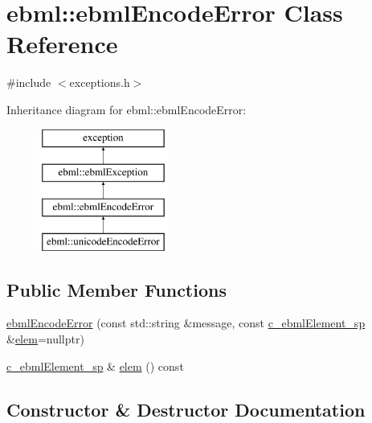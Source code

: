 \hypertarget{classebml_1_1ebmlEncodeError}{}\section{ebml\+:\+:ebml\+Encode\+Error Class Reference}
\label{classebml_1_1ebmlEncodeError}


{\ttfamily \#include $<$exceptions.\+h$>$}

Inheritance diagram for ebml\+:\+:ebml\+Encode\+Error\+:\begin{figure}[H]
\begin{center}
\leavevmode
\includegraphics[height=4.000000cm]{classebml_1_1ebmlEncodeError}
\end{center}
\end{figure}
\subsection*{Public Member Functions}
\begin{DoxyCompactItemize}
\item 
\mbox{\hyperlink{classebml_1_1ebmlEncodeError_a18844f807f6e5a25283ed62ed59c4990}{ebml\+Encode\+Error}} (const std\+::string \&message, const \mbox{\hyperlink{namespaceebml_a2deef4e8071531b32e3533f1bf978917}{c\+\_\+ebml\+Element\+\_\+sp}} \&\mbox{\hyperlink{classebml_1_1ebmlEncodeError_acea050cc554e717e4d9845c0cf34d473}{elem}}=nullptr)
\item 
\mbox{\hyperlink{namespaceebml_a2deef4e8071531b32e3533f1bf978917}{c\+\_\+ebml\+Element\+\_\+sp}} \& \mbox{\hyperlink{classebml_1_1ebmlEncodeError_acea050cc554e717e4d9845c0cf34d473}{elem}} () const
\end{DoxyCompactItemize}


\subsection{Constructor \& Destructor Documentation}
\mbox{\label{classebml_1_1ebmlEncodeError_a18844f807f6e5a25283ed62ed59c4990}} 
